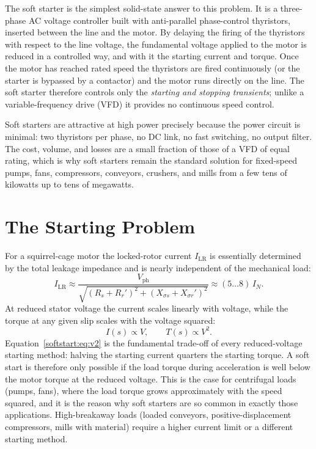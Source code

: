 The soft starter is the simplest solid-state answer to this problem. It is a
three-phase AC voltage controller built with anti-parallel phase-control
thyristors, inserted between the line and the motor. By delaying the firing
of the thyristors with respect to the line voltage, the fundamental voltage
applied to the motor is reduced in a controlled way, and with it the starting
current and torque. Once the motor has reached rated speed the thyristors are
fired continuously (or the starter is bypassed by a contactor) and the motor
runs directly on the line. The soft starter therefore controls only the
\emph{starting and stopping transients}; unlike a variable-frequency drive
(VFD) it provides no continuous speed control.

Soft starters are attractive at high power precisely because the power
circuit is minimal: two thyristors per phase, no DC link, no fast switching,
no output filter. The cost, volume, and losses are a small fraction of those
of a VFD of equal rating, which is why soft starters remain the standard
solution for fixed-speed pumps, fans, compressors, conveyors, crushers, and
mills from a few tens of kilowatts up to tens of megawatts.

\section{The Starting Problem}

For a squirrel-cage motor the locked-rotor current $I_\mathrm{LR}$ is
essentially determined by the total leakage impedance and is nearly
independent of the mechanical load:
\begin{equation}
  I_\mathrm{LR} \approx \frac{V_\mathrm{ph}}
  {\sqrt{(R_s + R_r')^2 + (X_{\sigma s} + X_{\sigma r}')^2}}
  \approx (5\ldots8)\,I_N .
\end{equation}
At reduced stator voltage the current scales linearly with voltage, while
the torque at any given slip scales with the voltage squared:
\begin{equation}
  I(s) \propto V, \qquad T(s) \propto V^2 .
  \label{softstart:eq:v2}
\end{equation}
Equation~\eqref{softstart:eq:v2} is the fundamental trade-off of every reduced-voltage
starting method: halving the starting current quarters the starting torque.
A soft start is therefore only possible if the load torque during
acceleration is well below the motor torque at the reduced voltage. This is
the case for centrifugal loads (pumps, fans), where the load torque grows
approximately with the speed squared, and it is the reason why soft starters
are so common in exactly those applications. High-breakaway loads (loaded
conveyors, positive-displacement compressors, mills with material) require a
higher current limit or a different starting method.

